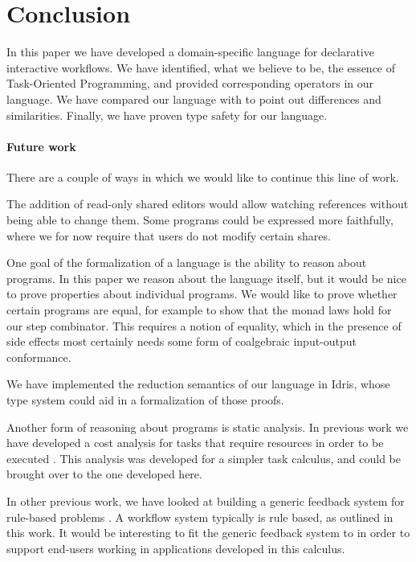 
\section{Conclusion}

\label{sec:conclusions}

In this paper we have developed a domain-specific language for declarative interactive workflows.
We have identified, what we believe to be, the essence of Task-Oriented Programming, and provided corresponding operators in our language.
We have compared our language with \CSP to point out differences and similarities.
Finally, we have proven type safety for our language.

\paragraph{Future work}

There are a couple of ways in which we would like to continue this line of work.

The addition of read-only shared editors would allow watching references without being able to change them.
Some programs could be expressed more faithfully, where we for now require that users do not modify certain shares.

One goal of the formalization of a language is the ability to reason about programs.
In this paper we reason about the language itself, but it would be nice to prove properties about individual programs.
We would like to prove whether certain programs are equal, for example to show that the monad laws hold for our step combinator.
This requires a notion of equality, which in the presence of side effects most certainly needs some form of coalgebraic input-output conformance.

We have implemented the reduction semantics of our language in Idris, whose type system could aid in a formalization of those proofs.

Another form of reasoning about programs is static analysis.
In previous work we have developed a cost analysis for tasks that require resources in order to be executed \cite{conf/ifl/KlinikJP17}.
This analysis was developed for a simpler task calculus, and could be brought over to the one developed here.

In other previous work, we have looked at building a generic feedback system for
rule-based problems \cite{UUCS2017013}. A workflow system typically is rule
based, as outlined in this work. It would be interesting to fit the generic
feedback system to \TOPHAT in order to support end-users working in applications
developed in this calculus.


